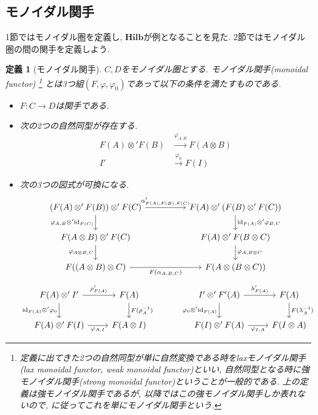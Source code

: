 \documentclass[a4paper,12pt]{ltjsarticle}
\theoremstyle{break}
\newtheorem{defn}[thm]{定義}
\newcommand{\hilb}{\mathbf{Hilb}}
\newcommand{\xr}[1]{\xrightarrow{#1}}
\newcommand{\id}{\mathrm{id}}
\newcommand{\al}{\alpha}
\newcommand{\la}{\lambda}
\newcommand{\vp}{\varphi}
\newcommand{\ot}{\otimes}
\numberwithin{equation}{section}
\begin{document}
\subsection{モノイダル関手}

1節ではモノイダル圏を定義し, $\hilb$が例となることを見た. 
2節ではモノイダル圏の間の関手を定義しよう. 

\begin{defn}[モノイダル関手]
  $C,D$をモノイダル圏とする. 
  モノイダル関手(monoidal functor)
  \footnote{
    定義に出てきた2つの自然同型が単に自然変換である時をlaxモノイダル関手(lax monoidal functor, weak monoidal functor)といい, 
    自然同型となる時に強モノイダル関手(strong monoidal functor)ということが一般的である.
    上の定義は強モノイダル関手であるが, 以降ではこの強モノイダル関手しか表れないので, \cite{cfqt}に従ってこれを単にモノイダル関手という. 
  }
  とは3つ組$(F,\vp,\vp_0)$であって以下の条件を満たすものである. 
  \begin{itemize}
    \item $F: C \to D$は関手である. 
    \item 次の2つの自然同型が存在する. 
      \begin{align*}
        F(A) \ot' F(B) &\xr{\vp_{A,B}} F(A \ot B) \\
        I' &\xr{\vp_0} F(I)
      \end{align*}  
    \item 次の3つの図式が可換になる. 
    \[\begin{tikzcd}
      {(F(A) \ot' F(B)) \ot' F(C)} && {F(A) \ot' (F(B) \ot' F(C))} \\
      {F(A \ot B) \ot' F(C)} && {F(A) \ot' F(B \ot C)} \\
      {F((A \ot B) \ot C)} && {F(A \ot (B \ot C))}
      \arrow["{\al'_{F(A),F(B),F(C)}}", from=1-1, to=1-3]
      \arrow["{\vp_{A,B} \ot' \id_{F(C)}}"', from=1-1, to=2-1]
      \arrow["{\vp_{A \ot B,C}}"', from=2-1, to=3-1]
      \arrow["{\id_{F(A)} \ot' \vp_{B,C}}", from=1-3, to=2-3]
      \arrow["{\vp_{A,B \ot C}}", from=2-3, to=3-3]
      \arrow["{F(\al_{A,B,C})}"', from=3-1, to=3-3]
    \end{tikzcd}\]
    \[\begin{tikzcd}
      {F(A) \ot' I'} & {F(A)} && {I' \ot' F'(A)} & {F(A)} \\
      {F(A) \ot' F(I)} & {F(A \ot I)} && {F(I) \ot' F(A)} & {F(I \ot A)}
      \arrow["{\rho'_{F(A)}}", from=1-1, to=1-2]
      \arrow["{\id_{F(A)} \ot' \vp_0}"', from=1-1, to=2-1]
      \arrow["{\vp_{A,I}}"', from=2-1, to=2-2]
      \arrow["{F(\rho_A^{-1})}", from=1-2, to=2-2]
      \arrow["{\la'_{F(A)}}", from=1-4, to=1-5]
      \arrow["{\vp_0 \ot' \id_{F(A)}}"', from=1-4, to=2-4]
      \arrow["{F(\la_A^{-1})}", from=1-5, to=2-5]
      \arrow["{\vp_{I,A}}"', from=2-4, to=2-5]
    \end{tikzcd}\]
  \end{itemize}  
\end{defn}
\end{document}
